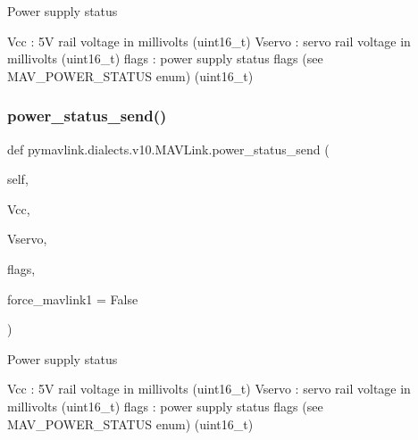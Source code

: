 \begin{DoxyVerb}
\begin{DoxyVerb}
\begin{DoxyVerb}
\begin{DoxyVerb}
\begin{DoxyVerb}Power supply status

Vcc                       : 5V rail voltage in millivolts (uint16_t)
Vservo                    : servo rail voltage in millivolts (uint16_t)
flags                     : power supply status flags (see MAV_POWER_STATUS enum) (uint16_t)\end{DoxyVerb}
 \mbox{\label{classpymavlink_1_1dialects_1_1v10_1_1MAVLink_a7b8fed4069c44b36e6caec9d584f82f0}} 
\subsubsection{\texorpdfstring{power\+\_\+status\+\_\+send()}{power\_status\_send()}}
{\footnotesize\ttfamily def pymavlink.\+dialects.\+v10.\+M\+A\+V\+Link.\+power\+\_\+status\+\_\+send (\begin{DoxyParamCaption}\item[{}]{self,  }\item[{}]{Vcc,  }\item[{}]{Vservo,  }\item[{}]{flags,  }\item[{}]{force\+\_\+mavlink1 = {\ttfamily False} }\end{DoxyParamCaption})}

\begin{DoxyVerb}Power supply status

Vcc                       : 5V rail voltage in millivolts (uint16_t)
Vservo                    : servo rail voltage in millivolts (uint16_t)
flags                     : power supply status flags (see MAV_POWER_STATUS enum) (uint16_t)\end{DoxyVerb}
 \mbox{\label{classpymavlink_1_1dialects_1_1v10_1_1MAVLink_a2ba74c3f43a84e12e97bdaa98e7e419b}} 

\end{DoxyVerb}
\end{DoxyVerb}
\end{DoxyVerb}
\end{DoxyVerb}
